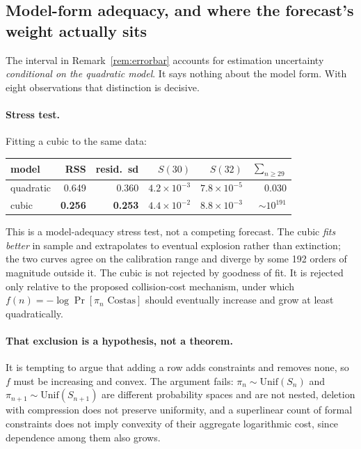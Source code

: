 \documentclass[11pt,a4paper]{article}
\theoremstyle{definition}
\begin{document}
\subsection{Model-form adequacy, and where the forecast's weight actually sits}
\label{sec:adequacy}

The interval in Remark~\ref{rem:errorbar} accounts for estimation uncertainty
\emph{conditional on the quadratic model}. It says nothing about the model form.
With eight observations that distinction is decisive.

\paragraph{Stress test.} Fitting a cubic to the same data:

\begin{center}
\begin{tabular}{@{}lrrrrr@{}}
\toprule
model & RSS & resid.\ sd & $S(30)$ & $S(32)$ & $\sum_{n\ge29}$ \\
\midrule
quadratic & 0.649 & 0.360 & $4.2\times10^{-3}$ & $7.8\times10^{-5}$ & $0.030$ \\
cubic & \textbf{0.256} & \textbf{0.253} & $4.4\times10^{-2}$ & $8.8\times10^{-3}$ & $\sim10^{191}$ \\
\bottomrule
\end{tabular}
\end{center}

\noindent This is a model-adequacy stress test, not a competing forecast. The
cubic \emph{fits better} in sample and extrapolates to eventual explosion rather
than extinction; the two curves agree on the calibration range and diverge by
some 192 orders of magnitude outside it. The cubic is not rejected by goodness of
fit. It is rejected only relative to the proposed collision-cost mechanism, under
which $f(n)=-\log\Pr[\pi_n \text{ Costas}]$ should eventually increase and grow at
least quadratically.

\paragraph{That exclusion is a hypothesis, not a theorem.} It is tempting to
argue that adding a row adds constraints and removes none, so $f$ must be
increasing and convex. The argument fails: $\pi_n\sim\mathrm{Unif}(S_n)$ and
$\pi_{n+1}\sim\mathrm{Unif}(S_{n+1})$ are different probability spaces and are not
nested, deletion with compression does not preserve uniformity, and a superlinear
count of formal constraints does not imply convexity of their aggregate
logarithmic cost, since dependence among them also grows.
\end{document}
